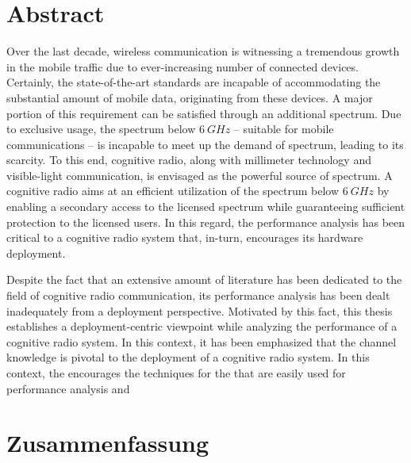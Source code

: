 
\chapter*{Abstract}
Over the last decade, wireless communication is witnessing a tremendous growth in the mobile traffic due to ever-increasing number of connected devices. Certainly, the state-of-the-art standards are incapable of accommodating the substantial amount of mobile data, originating from these devices. A major portion of this requirement can be satisfied through an additional spectrum. Due to exclusive usage, the spectrum below $\SI{6}{GHz}$ -- suitable for mobile communications -- is incapable to meet up the demand of spectrum, leading to its scarcity. To this end, cognitive radio, along with millimeter technology and visible-light communication, is envisaged as the powerful source of spectrum. A cognitive radio aims at an efficient utilization of the spectrum below $\SI{6}{GHz}$ by enabling a secondary access to the licensed spectrum while guaranteeing sufficient protection to the licensed users. In this regard, the performance analysis has been critical to a cognitive radio system that, in-turn, encourages its hardware deployment. 


Despite the fact that an extensive amount of literature has been dedicated to the field of cognitive radio communication, its performance analysis has been dealt inadequately from a deployment perspective. Motivated by this fact, this thesis establishes a deployment-centric viewpoint while analyzing the performance of a cognitive radio system. In this context, it has been emphasized that the channel knowledge is pivotal to the deployment of a cognitive radio system. In this context, the encourages the techniques for the that are easily used for performance analysis and   

\cleardoublepage
\chapter*{Zusammenfassung}


\cleardoublepage
